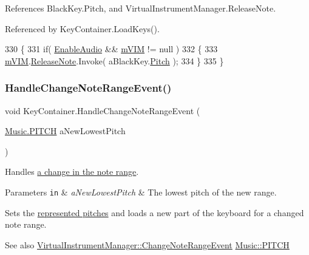 References Black\+Key.\+Pitch, and Virtual\+Instrument\+Manager.\+Release\+Note.



Referenced by Key\+Container.\+Load\+Keys().


\begin{DoxyCode}
330     \{
331         \textcolor{keywordflow}{if}( \hyperlink{group___key_contain_pub_var_ga5dc9b1349f8fafc894c7f739f6780a8c}{EnableAudio} && \hyperlink{group___key_contain_priv_var_ga57ee3824e2f284403bb70ad9c4dfd307}{mVIM} != null )
332         \{
333             \hyperlink{group___key_contain_priv_var_ga57ee3824e2f284403bb70ad9c4dfd307}{mVIM}.\hyperlink{group___v_i_m_events_ga3a1726a6366126421434c2c7be5e5678}{ReleaseNote}.Invoke( aBlackKey.\hyperlink{group___black_key_pub_var_gad233c456182c9cef7c01486484940439}{Pitch} );
334         \}
335     \}
\end{DoxyCode}
\mbox{\label{group___key_contain_event_handlers_ga0d82098e4f886f77a33f9d5ed13fe195}} 
\subsubsection{\texorpdfstring{Handle\+Change\+Note\+Range\+Event()}{HandleChangeNoteRangeEvent()}}
{\footnotesize\ttfamily void Key\+Container.\+Handle\+Change\+Note\+Range\+Event (\begin{DoxyParamCaption}\item[{\hyperlink{group___music_enums_ga508f69b199ea518f935486c990edac1d}{Music.\+P\+I\+T\+CH}}]{a\+New\+Lowest\+Pitch }\end{DoxyParamCaption})\hspace{0.3cm}{\ttfamily [private]}}



Handles \hyperlink{group___v_i_m_event_types_class_virtual_instrument_manager_1_1_change_note_range_event}{a change in the note range}. 


\begin{DoxyParams}[1]{Parameters}
\mbox{\tt in}  & {\em a\+New\+Lowest\+Pitch} & The lowest pitch of the new range.\\
\hline
\end{DoxyParams}
Sets the \hyperlink{group___key_contain_priv_var_ga103945a6efe3469191e5253d13fec5be}{represented pitches} and loads a new part of the keyboard for a changed note range. \begin{DoxySeeAlso}{See also}
\hyperlink{group___v_i_m_event_types_class_virtual_instrument_manager_1_1_change_note_range_event}{Virtual\+Instrument\+Manager\+::\+Change\+Note\+Range\+Event} \hyperlink{group___music_enums_ga508f69b199ea518f935486c990edac1d}{Music\+::\+P\+I\+T\+CH} 
\end{DoxySeeAlso}


